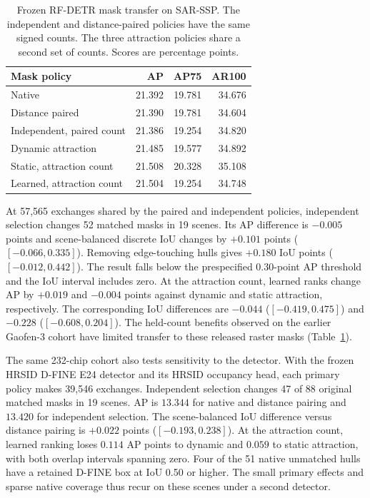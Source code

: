 \documentclass[journal]{IEEEtran}
\begin{document}
\begin{table}[t]
\centering
\caption{Frozen RF-DETR mask transfer on SAR-SSP. The independent and distance-paired policies have the same signed counts. The three attraction policies share a second set of counts. Scores are percentage points.}
\label{tab:sar-ssp}
\footnotesize
\begin{tabular}{@{}lrrr@{}}
\toprule
Mask policy & AP & AP75 & AR100 \\
\midrule
Native & 21.392 & 19.781 & 34.676 \\
Distance paired & 21.390 & 19.781 & 34.604 \\
Independent, paired count & 21.386 & 19.254 & 34.820 \\
\midrule
Dynamic attraction & 21.485 & 19.577 & 34.892 \\
Static, attraction count & 21.508 & 20.328 & 35.108 \\
Learned, attraction count & 21.504 & 19.254 & 34.748 \\
\bottomrule
\end{tabular}
\end{table}

At 57,565 exchanges shared by the paired and independent policies, independent selection changes 52 matched masks in 19 scenes. Its AP difference is \(-0.005\) points and scene-balanced discrete IoU changes by \(+0.101\) points (\([-0.066,0.335]\)). Removing edge-touching hulls gives \(+0.180\) IoU points (\([-0.012,0.442]\)). The result falls below the prespecified 0.30-point AP threshold and the IoU interval includes zero. At the attraction count, learned ranks change AP by \(+0.019\) and \(-0.004\) points against dynamic and static attraction, respectively. The corresponding IoU differences are \(-0.044\) (\([-0.419,0.475]\)) and \(-0.228\) (\([-0.608,0.204]\)). The held-count benefits observed on the earlier Gaofen-3 cohort have limited transfer to these released raster masks (Table~\ref{tab:sar-ssp}).

The same 232-chip cohort also tests sensitivity to the detector. With the frozen HRSID D-FINE E24 detector and its HRSID occupancy head, each primary policy makes 39,546 exchanges. Independent selection changes 47 of 88 original matched masks in 19 scenes. AP is \(13.344\) for native and distance pairing and \(13.420\) for independent selection. The scene-balanced IoU difference versus distance pairing is \(+0.022\) points (\([-0.193,0.238]\)). At the attraction count, learned ranking loses \(0.114\) AP points to dynamic and \(0.059\) to static attraction, with both overlap intervals spanning zero. Four of the 51 native unmatched hulls have a retained D-FINE box at IoU 0.50 or higher. The small primary effects and sparse native coverage thus recur on these scenes under a second detector.
\end{document}
